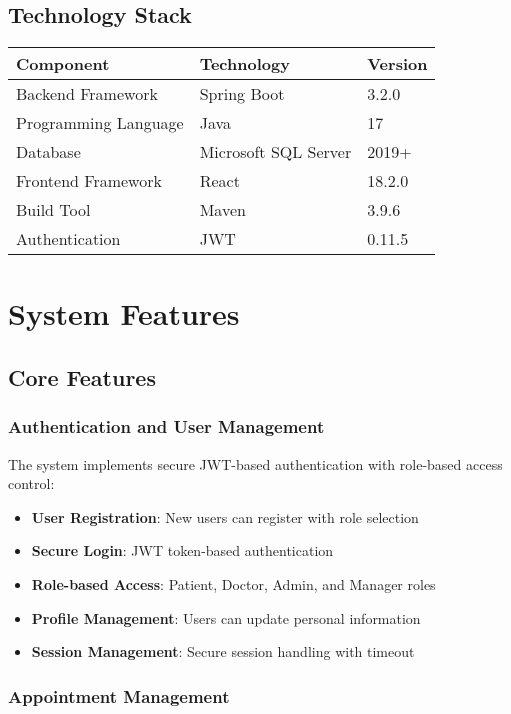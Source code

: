 \documentclass[12pt,a4paper]{article}
\begin{document}
\subsection{Technology Stack}

\begin{longtable}{|p{3cm}|p{3cm}|p{8cm}|}
\hline
\textbf{Component} & \textbf{Technology} & \textbf{Version} \\
\hline
Backend Framework & Spring Boot & 3.2.0 \\
\hline
Programming Language & Java & 17 \\
\hline
Database & Microsoft SQL Server & 2019+ \\
\hline
Frontend Framework & React & 18.2.0 \\
\hline
Build Tool & Maven & 3.9.6 \\
\hline
Authentication & JWT & 0.11.5 \\
\hline
\end{longtable}

\section{System Features}

\subsection{Core Features}

\subsubsection{Authentication and User Management}

The system implements secure JWT-based authentication with role-based access control:

\begin{itemize}
    \item \textbf{User Registration}: New users can register with role selection
    \item \textbf{Secure Login}: JWT token-based authentication
    \item \textbf{Role-based Access}: Patient, Doctor, Admin, and Manager roles
    \item \textbf{Profile Management}: Users can update personal information
    \item \textbf{Session Management}: Secure session handling with timeout
\end{itemize}

\subsubsection{Appointment Management}
\end{document}
